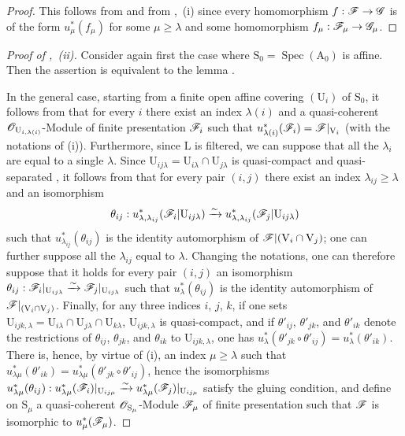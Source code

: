 \begin{proof}
This follows from  and from ,~(i) since every homomorphism $f:\mathscr{F}\to\mathscr{G}$ is of the form $u_\mu^*(f_\mu)$ for some $\mu\geqslant\lambda$ and some homomorphism $f_\mu:\mathscr{F}_\mu\to\mathscr{G}_\mu$.
\end{proof}

\begin{proof}[Proof of ,~(ii)]
Consider again first the case where $\mathrm{S}_0=\operatorname{Spec}(\mathrm{A}_0)$ is affine.
Then the assertion is equivalent to the lemma .

In the general case, starting from a finite open affine covering $(\mathrm{U}_i)$ of $\mathrm{S}_0$, it follows from  that for every $i$ there exist an index $\lambda(i)$ and a quasi-coherent $\mathscr{O}_{\mathrm{U}_{i,\lambda(i)}}$-Module of finite presentation $\mathscr{F}_i$ such that $u_{\lambda(i)}^*(\mathscr{F}_i)=\mathscr{F}|_{\mathrm{V}_i}$ (with the notations of (i)).
Furthermore, since $\mathrm{L}$ is filtered, we can suppose that all the $\lambda_i$ are equal to a single $\lambda$.
Since $\mathrm{U}_{ij\lambda}=\mathrm{U}_{i\lambda}\cap\mathrm{U}_{j\lambda}$ is quasi-compact and quasi-separated , it follows from  that for every pair $(i,j)$ there exist an index $\lambda_{ij}\geqslant\lambda$ and an isomorphism
\[
  \theta_{ij}:u_{\lambda,\lambda_{ij}}^*(\mathscr{F}_i|\mathrm{U}_{ij\lambda})\xrightarrow{\sim}u_{\lambda,\lambda_{ij}}^*(\mathscr{F}_j|\mathrm{U}_{ij\lambda})
\]
such that $u_{\lambda_{ij}}^*(\theta_{ij})$ is the identity automorphism of $\mathscr{F}|(\mathrm{V}_i\cap\mathrm{V}_j)$; one can further suppose all the $\lambda_{ij}$ equal to $\lambda$.
Changing the notations, one can therefore suppose that it holds for every pair $(i,j)$ an isomorphism $\theta_{ij}:\mathscr{F}_i|_{\mathrm{U}_{ij\lambda}}\xrightarrow{\sim}\mathscr{F}_j|_{\mathrm{U}_{ij\lambda}}$ such that $u_\lambda^*(\theta_{ij})$ is the identity automorphism of $\mathscr{F}|_{(\mathrm{V}_i\cap\mathrm{V}_j)}$.
Finally, for any three indices $i$, $j$, $k$, if one sets $\mathrm{U}_{ijk,\lambda}=\mathrm{U}_{i\lambda}\cap\mathrm{U}_{j\lambda}\cap\mathrm{U}_{k\lambda}$, $\mathrm{U}_{ijk,\lambda}$ is quasi-compact, and if $\theta'_{ij}$, $\theta'_{jk}$, and $\theta'_{ik}$ denote the restrictions of $\theta_{ij}$, $\theta_{jk}$, and $\theta_{ik}$ to $\mathrm{U}_{ijk,\lambda}$, one has $u_\lambda^*(\theta'_{jk}\circ\theta'_{ij})=u_\lambda^*(\theta'_{ik})$.
There is, hence, by virtue of (i), an index $\mu\geqslant\lambda$ such that $u_{\lambda\mu}^*(\theta'_{ik})=u_{\lambda\mu}^*(\theta'_{jk}\circ\theta'_{ij})$, hence the isomorphisms $u_{\lambda\mu}^*(\theta_{ij}):u_{\lambda\mu}^*(\mathscr{F}_i)|_{\mathrm{U}_{ij\mu}}\xrightarrow{\sim}u_{\lambda\mu}^*(\mathscr{F}_j)|_{\mathrm{U}_{ij\mu}}$ satisfy the gluing condition, and define on $\mathrm{S}_\mu$ a quasi-coherent $\mathscr{O}_{\mathrm{S}_\mu}$-Module $\mathscr{F}_\mu$ of finite presentation  such that $\mathscr{F}$ is isomorphic to $u_\mu^*(\mathscr{F}_\mu)$.
\end{proof}

